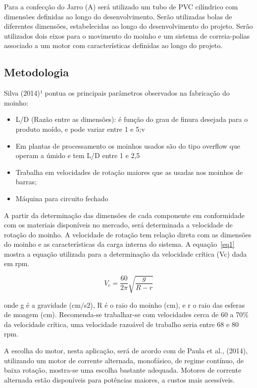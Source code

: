 \documentclass[a4paper, 12pt, brazil]{article}
\begin{document}
Para a confecção do Jarro (A) será utilizado um tubo de PVC cilíndrico com dimensões definidas ao longo do desenvolvimento. Serão utilizadas bolas de diferentes dimensões, estabelecidas ao longo do desenvolvimento do projeto. Serão utilizados dois eixos para o movimento do moinho e um sistema de correia-polias associado a um motor com características definidas ao longo do projeto.
\subsection{Metodologia} 
Silva (2014)¹ pontua os principais parâmetros observados na fabricação do moinho:
     \begin{itemize}
     	\item L/D (Razão entre as dimensões): é função do grau de finura desejada para o produto moído, e pode variar entre 1 e 5;v
        \item Em plantas de processamento os moinhos usados são do tipo overflow que operam a úmido e tem L/D entre 1 e 2,5
        \item Trabalha em velocidades de rotação maiores que as usadas nos moinhos de barras;
        \item Máquina para circuito fechado
     \end{itemize}
\par
A partir da determinação das dimensões de cada componente em conformidade com os materiais disponíveis no mercado, será determinada a velocidade de rotação do moinho. A velocidade de rotação tem relação direta com as dimensões do moinho e as características da carga interna do sistema. A equação~\ref{eq1} mostra a equação utilizada para a determinação da velocidade crítica (Vc) dada em rpm.

\begin{equation}
V_c=\frac{60}{2\pi}\sqrt{\frac{g}{R-r}}
\label{eq1}
\end{equation}

onde g é a gravidade (cm/s2), R é o raio do moinho (cm), e r o raio das esferas de moagem (cm). Recomenda-se trabalhar-se com velocidades cerca de 60 a 70\% da velocidade crítica, uma velocidade razoável de trabalho seria entre 68 e 80 rpm.
\newline

A escolha do motor, nesta aplicação, será de acordo com de Paula et al., (2014), utilizando um motor de corrente alternada, monofásico, de regime contínuo, de baixa rotação, mostra-se uma escolha bastante adequada. Motores de corrente alternada estão disponíveis para potências maiores, a custos mais acessíveis.
\newline
\end{document}
